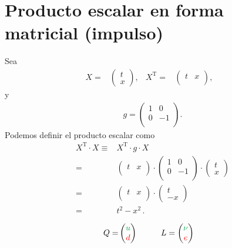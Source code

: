 \documentclass[11pt,a4paper]{article}
\begin{document}
\section{Producto escalar en forma matricial (impulso)}
Sea 
\begin{align*}
    X =& \begin{pmatrix}
        t\\  
        x
    \end{pmatrix},&
    X^{\operatorname{T}} =& 
    \begin{pmatrix}
        t&x\\
    \end{pmatrix},&
\end{align*}
y
\begin{align*}
    g = \begin{pmatrix}
        1 & 0\\
        0 & -1\\
    \end{pmatrix}.
\end{align*}
Podemos definir el producto escalar como
\begin{align*}
    X^{\operatorname{T}}\cdot X 
   \equiv & X^{\operatorname{T}}\cdot g \cdot X \\
   = &\begin{pmatrix}
        t&x\\
    \end{pmatrix}\cdot  \begin{pmatrix}
        1 & 0\\
        0 & -1\\
    \end{pmatrix} \cdot \begin{pmatrix}
        t\\  
        x
    \end{pmatrix} \\
   = &\begin{pmatrix}
        t&x\\
    \end{pmatrix}\cdot \begin{pmatrix}
        t\\  
        -x
    \end{pmatrix} \\
= & t^2 - x ^2\,.
\end{align*}




\begin{align*}
    Q =&\begin{pmatrix}
      \color{Green}  u\\
       \color{red} d
    \end{pmatrix} \hspace{1cm}
    L= \begin{pmatrix}
      \color{Green}  \nu\\
       \color{red} e
    \end{pmatrix}
\end{align*}
\end{document}
